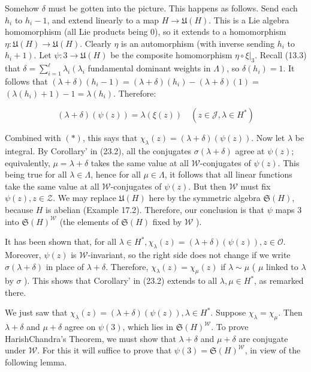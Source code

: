 \documentclass[10pt]{article}
\begin{document}
Somehow $\delta$ must be gotten into the picture. This happens as follows. Send each $h_{i}$ to $h_{i}-1$, and extend linearly to a map $H \rightarrow \mathfrak{U}(H)$. This is a Lie algebra homomorphism (all Lie products being 0), so it extends to a homomorphism $\eta: \mathfrak{U}(H) \rightarrow \mathfrak{U}(H)$. Clearly $\eta$ is an automorphism (with inverse sending $h_{i}$ to $\left.h_{i}+1\right)$. Let $\psi: 3 \rightarrow \mathfrak{U}(H)$ be the composite homomorphism $\left.\eta \circ \xi\right|_{3}$. Recall (13.3) that $\delta=\sum_{i=1}^{\ell} \lambda_{i}\left(\lambda_{i}\right.$ fundamental dominant weights in $\left.\Lambda\right)$, so $\delta\left(h_{i}\right)=1$. It follows that $(\lambda+\delta)\left(h_{i}-1\right)=(\lambda+\delta)\left(h_{i}\right)-(\lambda+\delta)(1)=$ $\left(\lambda\left(h_{i}\right)+1\right)-1=\lambda\left(h_{i}\right)$. Therefore:


\begin{equation*}
(\lambda+\delta)(\psi(z))=\lambda(\xi(z)) \quad\left(z \in \mathcal{J}, \lambda \in H^{*}\right) \tag{**}
\end{equation*}


Combined with $(*)$, this says that $\chi_{\lambda}(z)=(\lambda+\delta)(\psi(z))$. Now let $\lambda$ be integral. By Corollary' in (23.2), all the conjugates $\sigma(\lambda+\delta)$ agree at $\psi(z)$; equivalently, $\mu=\lambda+\delta$ takes the same value at all $\mathscr{W}$-conjugates of $\psi(z)$. This being true for all $\lambda \in \Lambda$, hence for all $\mu \in \Lambda$, it follows that all linear functions take the same value at all $\mathscr{W}$-conjugates of $\psi(z)$. But then $\mathscr{W}$ must fix $\psi(z), z \in \mathcal{Z}$. We may replace $\mathfrak{U}(H)$ here by the symmetric algebra $\mathfrak{S}(H)$, because $H$ is abelian (Example 17.2). Therefore, our conclusion is that $\psi$ maps 3 into $\mathfrak{S}(H)^{\mathscr{W}}$ (the elements of $\mathfrak{S}(H)$ fixed by $\mathscr{W}$ ).

It has been shown that, for all $\lambda \in H^{*}, \chi_{\lambda}(z)=(\lambda+\delta)(\psi(z)), z \in \mathcal{O}$. Moreover, $\psi(z)$ is $\mathscr{W}$-invariant, so the right side does not change if we write $\sigma(\lambda+\delta)$ in place of $\lambda+\delta$. Therefore, $\chi_{\lambda}(z)=\chi_{\mu}(z)$ if $\lambda \sim \mu$ ( $\mu$ linked to $\lambda$ by $\sigma$ ). This shows that Corollary' in (23.2) extends to all $\lambda, \mu \in H^{*}$, as remarked there.

We just saw that $\chi_{\lambda}(z)=(\lambda+\delta)(\psi(z)), \lambda \in H^{*}$. Suppose $\chi_{\lambda}=\chi_{\mu}$. Then $\lambda+\delta$ and $\mu+\delta$ agree on $\psi(3)$, which lies in $\mathfrak{S}(H)^{\mathscr{W}}$. To prove HarishChandra's Theorem, we must show that $\lambda+\delta$ and $\mu+\delta$ are conjugate under $\mathscr{W}$. For this it will suffice to prove that $\psi(\mathfrak{3})=\mathfrak{S}(H)^{\mathscr{W}}$, in view of the following lemma.
\end{document}
